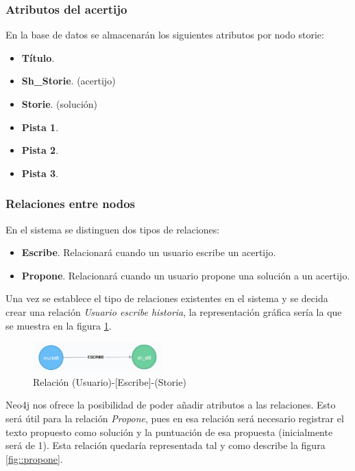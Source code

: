 \subsubsection{Atributos del acertijo}
En la base de datos se almacenarán los siguientes atributos por nodo storie:

\begin{itemize}
    \item \textbf{Título}.
    \item \textbf{Sh\_Storie}. (acertijo)
    \item \textbf{Storie}. (solución)
    \item \textbf{Pista 1}.
    \item \textbf{Pista 2}.
    \item \textbf{Pista 3}.
\end{itemize}

\subsubsection{Relaciones entre nodos}

En el sistema se distinguen dos tipos de relaciones:

\begin{itemize}
    \item \textbf{Escribe}. Relacionará cuando un usuario escribe un acertijo.
    \item \textbf{Propone}. Relacionará cuando un usuario propone una solución a un acertijo.
\end{itemize}

Una vez se establece el tipo de relaciones existentes en el sistema y se decida crear una relación \textit{Usuario escribe historia}, la representación gráfica sería la que se muestra en la figura \ref{fig::escribe}.

\begin{figure}[hbtp]
     \centerline{\includegraphics[width=5cm]{figuras/escribe.png}}
    \caption{Relación (Usuario)-[Escribe]-(Storie)} 
    \label{fig::escribe}
\end{figure}

Neo4j nos ofrece la posibilidad de poder añadir atributos a las relaciones. Esto será útil para la relación \textit{Propone}, pues en esa relación será necesario registrar el texto propuesto como solución y la puntuación de esa propuesta (inicialmente será de 1). Esta relación quedaría representada tal y como describe la figura \ref{fig::propone}.

